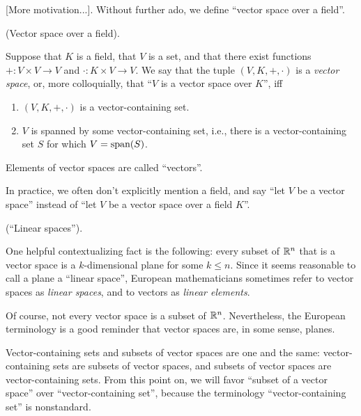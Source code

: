 [More motivation...]. Without further ado, we define ``vector space over a field''.

\begin{defn}
\label{ch::lin_alg::defn::vector_space}
    (Vector space over a field).
    
    Suppose that $K$ is a field, that $V$ is a set, and that there exist functions $+:V \times V \rightarrow V$ and $\cdot:K \times V \rightarrow V$. We say that the tuple $(V, K, +, \cdot)$ is a \textit{vector space}, or, more colloquially, that ``$V$ is a vector space over $K$'', iff 

    \begin{enumerate}
        \item $(V, K, +, \cdot)$ is a vector-containing set.
        \item $V$ is spanned by some vector-containing set, i.e., there is a vector-containing set $S$ for which $V = \text{span}(S)$. 
    \end{enumerate}
    
    Elements of vector spaces are called ``vectors''.
    
    In practice, we often don't explicitly mention a field, and say ``let $V$ be a vector space'' instead of ``let $V$ be a vector space over a field $K$''.
\end{defn}

\begin{remark}
    (``Linear spaces'').

    One helpful contextualizing fact is the following: every subset of $\mathbb{R}^n$ that is a vector space is a $k$-dimensional plane for some $k \leq n$. Since it seems reasonable to call a plane a ``linear space'', European mathematicians sometimes refer to vector spaces as \textit{linear spaces}, and to vectors as \textit{linear elements}.
    
    Of course, not every vector space is a subset of $\mathbb{R}^n$. Nevertheless, the European terminology is a good reminder that vector spaces are, in some sense, planes.
\end{remark}

\begin{remark}
    Vector-containing sets and subsets of vector spaces are one and the same: vector-containing sets are subsets of vector spaces, and subsets of vector spaces are vector-containing sets. From this point on, we will favor ``subset of a vector space'' over ``vector-containing set'', because the terminology ``vector-containing set'' is nonstandard.
\end{remark}

